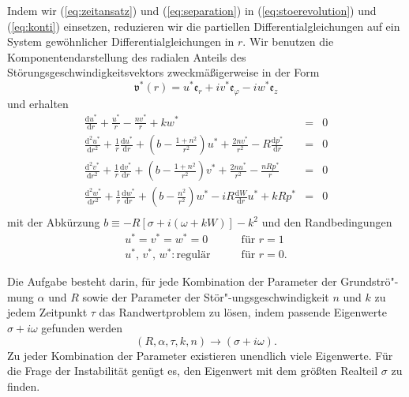 \documentclass[10pt,a5paper,oneside,draft]{book}
\numberwithin{equation}{chapter}
\begin{document}
Indem wir (\mbox{\ref{eq:zeitansatz}}) und (\mbox{\ref{eq:separation}}) in (\mbox{\ref{eq:stoerevolution}}) und (\mbox{\ref{eq:konti}}) einsetzen, reduzieren wir die partiellen Differentialgleichungen auf ein System gew\"ohnlicher Differentialgleichungen in $r$.
Wir benutzen die Komponentendarstellung des radialen Anteils des St\"orungsgeschwindigkeitsvektors zweckm\"a\ss igerweise in der Form
\begin{equation}\label{eq:eigenfunktion}
	\mathfrak{v}^*(r) = u^* \mathfrak{e}_r + iv^* \mathfrak{e}_\varphi - iw^* \mathfrak{e}_z
\end{equation}
und erhalten
\begin{equation}\label{eq:rwp}
        \begin{aligned}
        \frac{\mathrm{d} u^*}{\mathrm{d} r} + \frac{u^*}{r} - \frac{nv^*}{r} + kw^* &=&  0 \\
        \frac{\mathrm{d} ^2 u^*}{\mathrm{d} r^2} + \frac{1}{r}\frac{\mathrm{d} u^*}{\mathrm{d} r} + \left( b - \frac{1+n^2}{r^2}\right)u^* + \frac{2nv^*}{r^2} -R\frac{\mathrm{d} p^*}{\mathrm{d} r}&=& 0 \\
        \frac{\mathrm{d} ^2 v^*}{\mathrm{d} r^2} + \frac{1}{r}\frac{\mathrm{d} v^*}{\mathrm{d} r} + \left( b - \frac{1+n^2}{r^2}\right)v^* + \frac{2nu^*}{r^2} -\frac{nRp^*}{r}&=& 0 \\
        \frac{\mathrm{d} ^2 w^*}{\mathrm{d} r^2} + \frac{1}{r}\frac{\mathrm{d} w^*}{\mathrm{d} r} + \left( b - \frac{n^2}{r^2}\right)w^* -iR\frac{\mathrm{d} W}{\mathrm{d} r} u^* + kRp^* &=& 0\\
        \end{aligned}
\end{equation}
mit der Abk\"urzung $ b \equiv -R[\sigma + i(\omega + kW)] - k^2 $ und den Randbedingungen
\begin{equation}\label{eq:rwp:rand}
	\begin{split}
	u^* = v^* = w^* = 0 &\qquad\textrm{f\"ur } r=1\\
	u^*,\,v^*,\,w^*: \textrm{regul\"ar}&\qquad\textrm{f\"ur } r=0.
	\end{split}
\end{equation}

Die Aufgabe besteht darin, f\"ur jede Kombination der Parameter der Grundstr\"o"-mung $\alpha$ und $R$ sowie der Parameter der St\"or"-ungsgeschwindigkeit $n$ und $k$ zu jedem Zeitpunkt $\tau$ das Randwertproblem zu l\"osen, indem passende Eigenwerte $\sigma+i\omega$ gefunden werden
\begin{equation}\label{eq:parameter}
	(R,\alpha,\tau,k,n) \to (\sigma+i\omega).
\end{equation}
Zu jeder Kombination der Parameter existieren unendlich viele Eigenwerte.
F\"ur die Frage der Instabilit\"at gen\"ugt es, den Eigenwert mit dem gr\"o\ss ten Realteil $\sigma$ zu finden.\\
\end{document}
